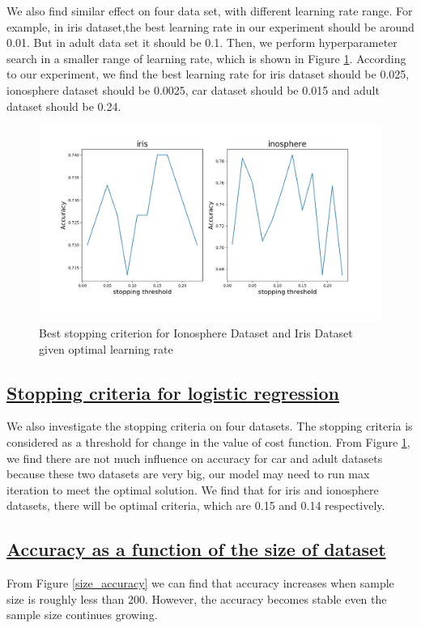 \documentclass[11pt]{scrartcl}
\begin{document}
We also find similar effect on four data set, with different learning rate range. For example, in iris dataset,the best learning rate in our experiment should be around 0.01. But in adult data set it should be 0.1. Then, we perform hyperparameter search in a smaller range of learning rate, which is shown in Figure \ref{stopping_cri_lr}. According to our experiment, we find the best learning rate for iris dataset should be 0.025, ionosphere dataset should be 0.0025, car dataset should be 0.015 and adult dataset should be 0.24.

\begin{figure}[H]
	\centering
	\includegraphics[width=0.68\linewidth]{fig/stopping-threshold.png}
	\caption{Best stopping criterion for Ionosphere Dataset and Iris Dataset given optimal learning rate}
	\label{stopping_cri_lr}
\end{figure}

\subsection*{\underline{Stopping criteria for logistic regression}}

We also investigate the stopping criteria on four datasets. The stopping criteria is considered as a threshold for change in the value of cost function. From Figure \ref{stopping_cri_lr}, we find there are not much influence on accuracy for car and adult datasets because these two datasets are very big, our model may need to run max iteration to meet the optimal solution. We find that for iris and ionosphere datasets, there will be optimal criteria, which are 0.15 and 0.14 respectively.



\subsection*{\underline{Accuracy as a function of the size of dataset}}


From Figure \ref{size_accuracy} we can find that accuracy increases when sample size is roughly less than 200. However, the accuracy becomes stable even the sample size continues growing. 
\end{document}

